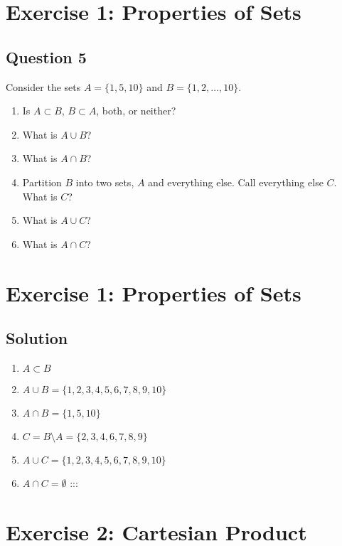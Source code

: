 \documentclass[
  11pt,
  letterpaper,
  DIV=11,
  numbers=noendperiod]{scrartcl}
\providecommand{\tightlist}{%
  \setlength{\itemsep}{0pt}\setlength{\parskip}{0pt}}\usepackage{longtable,booktabs,array}
\begin{document}
\section{Exercise 1: Properties of
Sets}\label{exercise-1-properties-of-sets}

\subsection{Question 5}\label{question-5}

Consider the sets \(A = \{1, 5, 10\}\) and \(B = \{1, 2, \ldots, 10\}\).

\begin{enumerate}
\def\labelenumi{\arabic{enumi}.}
\tightlist
\item
  Is \(A \subset B\), \(B \subset A\), both, or neither?
\item
  What is \(A \cup B\)?
\item
  What is \(A \cap B\)?
\item
  Partition \(B\) into two sets, \(A\) and everything else. Call
  everything else \(C\). What is \(C\)?
\item
  What is \(A \cup C\)?
\item
  What is \(A \cap C\)?
\end{enumerate}

\section{Exercise 1: Properties of
Sets}\label{exercise-1-properties-of-sets-1}

\subsection{Solution}\label{solution}

\begin{enumerate}
\def\labelenumi{\arabic{enumi}.}
\tightlist
\item
  \(A \subset B\)
\item
  \(A \cup B = \{1, 2, 3, 4, 5, 6, 7, 8, 9, 10\}\)
\item
  \(A \cap B = \{1, 5, 10\}\)
\item
  \(C = B \setminus A = \{2, 3, 4, 6, 7, 8, 9\}\)
\item
  \(A \cup C = \{1, 2, 3, 4, 5, 6, 7, 8, 9, 10\}\)
\item
  \(A \cap C = \emptyset\) :::
\end{enumerate}

\section{Exercise 2: Cartesian
Product}\label{exercise-2-cartesian-product}
\end{document}
